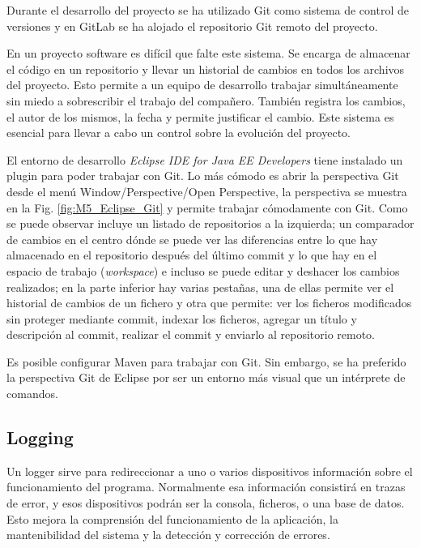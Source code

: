 Durante el desarrollo del proyecto se ha utilizado Git como sistema de control de versiones y en GitLab se ha alojado el repositorio Git remoto del proyecto.

En un proyecto software es difícil que falte este sistema. Se encarga de almacenar el código en un repositorio y llevar un historial de cambios en todos los archivos del proyecto. Esto permite a un equipo de desarrollo trabajar simultáneamente sin miedo a sobrescribir el trabajo del compañero. También registra los cambios, el autor de los mismos, la fecha y permite justificar el cambio. Este sistema es esencial para llevar a cabo un control sobre la evolución del proyecto.

El entorno de desarrollo \textit{Eclipse IDE for Java EE Developers} tiene instalado un plugin para poder trabajar con Git. Lo más cómodo es abrir la perspectiva Git desde el menú Window/Perspective/Open Perspective, la perspectiva se muestra en la Fig. \ref{fig:M5_Eclipse_Git} y permite trabajar cómodamente con Git. Como se puede observar incluye un listado de repositorios a la izquierda; un comparador de cambios en el centro dónde se puede ver las diferencias entre lo que hay almacenado en el repositorio después del último commit y lo que hay en el espacio de trabajo (\textit{workspace}) e incluso se puede editar y deshacer los cambios realizados; en la parte inferior hay varias pestañas, una de ellas permite ver el historial de cambios de un fichero y otra que permite: ver los ficheros modificados sin proteger mediante commit, indexar los ficheros, agregar un título y descripción al commit, realizar el commit y enviarlo al repositorio remoto.


Es posible configurar Maven para trabajar con Git. Sin embargo, se ha preferido la perspectiva Git de Eclipse por ser un entorno más visual que un intérprete de comandos.

\subsection{Logging}

Un logger sirve para redireccionar a uno o varios dispositivos información sobre el funcionamiento del programa. Normalmente esa información consistirá en trazas de error, y esos dispositivos podrán ser la consola, ficheros, o una base de datos. Esto mejora la comprensión del funcionamiento de la aplicación, la mantenibilidad del sistema y la detección y corrección de errores.

